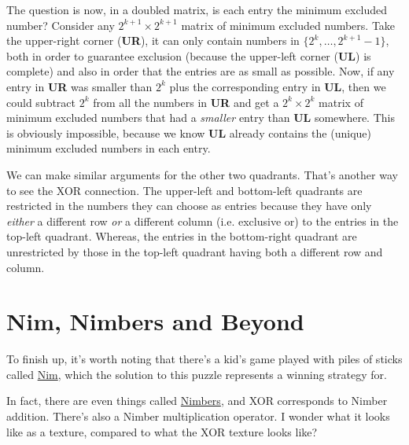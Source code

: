 \documentclass[11pt]{article}
\begin{document}
The question is now, in a doubled matrix, is each entry the minimum excluded number? Consider any $2^{k + 1} \times 2^{k + 1}$ matrix of minimum excluded numbers. Take the upper-right corner (\textbf{UR}), it can only contain numbers in $\lbrace 2^k, \ldots, 2^{k + 1} - 1 \rbrace$, both in order to guarantee exclusion (because the upper-left corner (\textbf{UL}) is complete) and also in order that the entries are as small as possible. Now, if any entry in \textbf{UR} was smaller than $2^k$ plus the corresponding entry in \textbf{UL}, then we could subtract $2^k$ from all the numbers in \textbf{UR} and get a $2^k \times 2^k$ matrix of minimum excluded numbers that had a \emph{smaller} entry than \textbf{UL} somewhere. This is obviously impossible, because we know \textbf{UL} already contains the (unique) minimum excluded numbers in each entry.

We can make similar arguments for the other two quadrants. That's another way to see the XOR connection. The upper-left and bottom-left quadrants are restricted in the numbers they can choose as entries because they have only \emph{either} a different row \emph{or} a different column (i.e. exclusive or) to the entries in the top-left quadrant. Whereas, the entries in the bottom-right quadrant are unrestricted by those in the top-left quadrant having both a different row and column.

\section{Nim, Nimbers and Beyond}

To finish up, it's worth noting that there's a kid's game played with piles of sticks called \href{http://en.wikipedia.org/wiki/Nim}{Nim}, which the solution to this puzzle represents a winning strategy for.

In fact, there are even things called \href{http://en.wikipedia.org/wiki/Nimber}{Nimbers}, and XOR corresponds to Nimber addition. There's also a Nimber multiplication operator. I wonder what it looks like as a texture, compared to what the XOR texture looks like?
\end{document}
